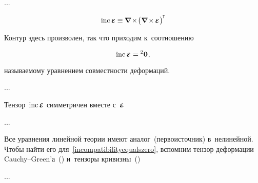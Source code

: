 \begin{otherlanguage}{russian}
...

\begin{equation*}
\operatorname{inc} \mathboldepsilon \hspace{-0.05ex}
\equiv
\hspace{-0.07ex} \boldnabla \hspace{-0.2ex} \times \hspace{-0.36ex} \bigl( \hspace{.06ex} \boldnabla \hspace{-0.2ex} \times \hspace{-0.16ex} \mathboldepsilon \hspace{.1ex} \bigr)^{\hspace{-0.2ex}\T}
\end{equation*}

Контур здесь произволен, так что приходим к~соотношению

\nopagebreak\vspace{-0.25em}\begin{equation}\label{incompatibilityequalszero}
\operatorname{inc} \mathboldepsilon = \hspace{-0.07ex} {^2\bm{0}}
\hspace{.1ex} ,
\end{equation}

\vspace{-0.33em} \noindent называемому уравнением совместности деформаций.

...

Тензор~${\operatorname{inc} \mathboldepsilon}$ симметричен вместе с~${\mathboldepsilon}$

...

Все уравнения линейной теории имеют аналог~(перво\-источ\-ник) в~нелинейной. Чтобы найти его для~\eqref{incompatibilityequalszero}, вспомним тензор деформации Cauchy\hbox{--}Green’а~() и~тензоры кривизны~()

...



\end{otherlanguage}



